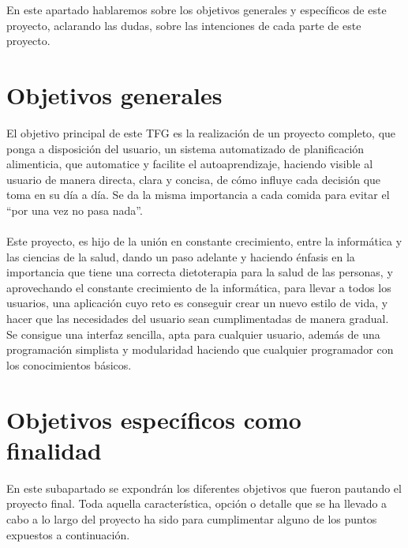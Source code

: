 
En este apartado hablaremos sobre los objetivos generales y específicos de este proyecto, aclarando las dudas, sobre las intenciones de cada parte de este proyecto.
\section{Objetivos generales}
El objetivo principal de este TFG es la realización de un proyecto completo, que ponga a disposición del usuario, un sistema automatizado de planificación alimenticia, que automatice y facilite el autoaprendizaje, haciendo visible al usuario de manera directa, clara y concisa, de cómo influye cada decisión que toma en su día a día. Se da la misma importancia a cada comida para evitar el “por una vez no pasa nada”. \\
\\
Este proyecto, es hijo de la unión en constante crecimiento, entre la informática y las ciencias de la salud, dando un paso adelante y haciendo énfasis en la importancia que tiene una correcta dietoterapia para la salud de las personas, y aprovechando el constante crecimiento de la informática, para llevar a todos los usuarios, una aplicación cuyo reto es conseguir crear un nuevo estilo de vida, y hacer que las necesidades del usuario sean cumplimentadas de manera gradual.
\\
Se consigue una interfaz sencilla, apta para cualquier usuario, además de una programación simplista y modularidad haciendo que cualquier programador con los conocimientos básicos.
\\
\section{Objetivos específicos como finalidad}
En este subapartado se expondrán los diferentes objetivos que fueron pautando el proyecto final. Toda aquella característica, opción o detalle que se ha llevado a cabo a lo largo del proyecto ha sido para cumplimentar alguno de los puntos expuestos a continuación.


